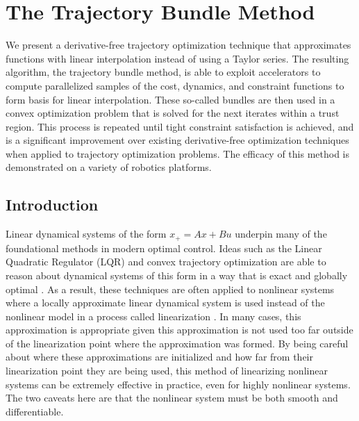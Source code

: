 \graphicspath{{bundles/}}


\chapter{The Trajectory Bundle Method}
\label{sec:bundles}
We present a derivative-free trajectory optimization technique that approximates functions with linear interpolation instead of using a Taylor series. The resulting algorithm, the trajectory bundle method, is able to exploit accelerators to compute parallelized samples of the cost, dynamics, and constraint functions to form basis for linear interpolation. These so-called bundles are then used in a convex optimization problem that is solved for the next iterates within a trust region. This process is repeated until tight constraint satisfaction is achieved, and is a significant improvement over existing derivative-free optimization techniques when applied to trajectory optimization problems. The efficacy of this method is demonstrated on a variety of robotics platforms.


\section{Introduction}\label{sec:bundles:introduction}
Linear dynamical systems of the form $x_{+} = Ax + Bu$ underpin many of the foundational methods in modern optimal control. Ideas such as the Linear Quadratic Regulator (LQR) and convex trajectory optimization are able to reason about dynamical systems of this form in a way that is exact and globally optimal \cite{kalman1960,borrelli2017,boyd2004}. As a result, these techniques are often applied to nonlinear systems where a locally approximate linear dynamical system is used instead of the nonlinear model in a process called linearization \cite{slotine1991}. In many cases, this approximation is appropriate given this approximation is not used too far outside of the linearization point where the approximation was formed. By being careful about where these approximations are initialized and how far from their linearization point they are being used, this method of linearizing nonlinear systems can be extremely effective in practice, even for highly nonlinear systems.  The two caveats here are that the nonlinear system must be both smooth and differentiable. 

